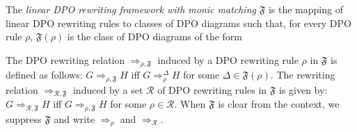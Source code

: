 \begin{definition}
    The \emph{linear DPO rewriting framework with monic matching} $\mathfrak{F}$ is the mapping of linear DPO rewriting rules to classes of DPO diagrams such that, for every DPO rule $\rho$, $\mathfrak{F}(\rho)$ is the class of DPO diagrams of the form
    \begin{center}
    \end{center}
    The DPO rewriting relation $\Rightarrow_{\rho,\mathfrak{F}}$ induced by a DPO rewriting rule $\rho$ in $\mathfrak{F}$ is defined as follows: $G \Rightarrow_{\rho,\mathfrak{F}} H$ iff $G \Rightarrow_\rho^\Delta H$ for some $\Delta \in \mathfrak{F}(\rho)$. 
    The rewriting relation $\Rightarrow_{\mathcal{R},\mathfrak{F}}$ induced by a set $\mathcal{R}$ of DPO rewriting rules in $\mathfrak{F}$ is given by: $G \Rightarrow_{\mathcal{R},\mathfrak{F}} H$ iff $G \Rightarrow_{\rho,\mathfrak{F}} H$ for some $\rho \in \mathcal{R}$. When $\mathfrak{F}$ is clear from the context, we 
    suppress $\mathfrak{F}$ and 
    write $\Rightarrow_{\rho}$ and $\Rightarrow_{\mathcal{R}}$.
\end{definition}